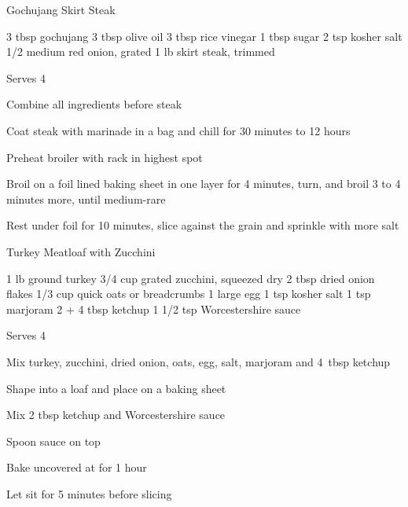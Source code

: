 \begin{recipe}{Gochujang Skirt Steak}{}
\begin{ingredients}
3 tbsp gochujang
3 tbsp olive oil
3 tbsp rice vinegar
1 tbsp sugar
2 tsp kosher salt
1/2 medium red onion, grated
1 lb skirt steak, \ibreak trimmed
\end{ingredients}
\nextcolumn
Serves 4
\begin{steps}
    \item Combine all ingredients before steak
    \item Coat steak with marinade in a bag and chill for 30 minutes to 12 hours
    \item Preheat broiler with rack in highest spot
    \item Broil on a foil lined baking sheet in one layer for 4 minutes, turn, and broil 3 to 4 minutes more, until medium-rare
    \item Rest under foil for 10 minutes, slice against the grain and sprinkle with more salt
\end{steps}
\end{recipe}

\begin{denserecipe}{Turkey Meatloaf with Zucchini}{}
\begin{ingredients}
1 lb ground turkey
3/4 cup grated zucchini, squeezed dry
2 tbsp dried onion flakes
1/3 cup quick oats or breadcrumbs
1 large egg
1 tsp kosher salt
1 tsp marjoram
2 + 4 tbsp ketchup
1 1/2 tsp Worcestershire sauce
\end{ingredients}
\nextcolumn
Serves 4
\begin{steps}
\item Mix turkey, zucchini, dried onion, oats, egg, salt, marjoram and 4~tbsp ketchup
\item Shape into a loaf and place on a baking sheet
\item Mix 2 tbsp ketchup and Worcestershire sauce
\item Spoon sauce on top
\item Bake uncovered at  for 1 hour
\item Let sit for 5 minutes before slicing
\end{steps}
\end{denserecipe}

